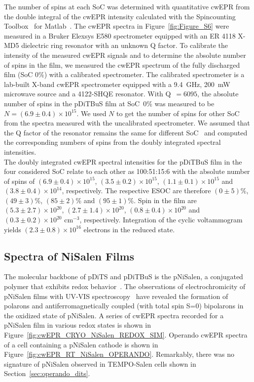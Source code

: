 The number of spins at each SoC was determined with quantitative cwEPR from the double integral of the cwEPR intensity calculated with the Spincounting Toolbox~\cite{spin_counting_tb} for Matlab~\cite{SI:Matlab}. The cwEPR spectra in Figure~\ref{fig:Figure_S6} were measured in a Bruker Elexsys E580 spectrometer equipped with an ER 4118 X-MD5 dielectric ring resonator with an unknown Q factor. To calibrate the intensity of the measured cwEPR signals and to determine the absolute number of spins in the film, we measured the cwEPR spectrum of the fully discharged film (SoC 0\%) with a calibrated spectrometer. The calibrated spectrometer is a lab-built X-band cwEPR spectrometer equipped with a 9.4~GHz, 200~mW microwave source and a 4122-SHQE resonator. With Q~$=6095$, the absolute number of spins in the pDiTBuS film at SoC~0\% was measured to be $N=(6.9\pm0.4)\times10^{15}$. We used $N$ to get the number of spins for other SoC from the spectra measured with the uncalibrated spectrometer. We assumed that the Q factor of the resonator remains the same for different SoC~\cite{Kulikov2022} and computed the corresponding numbers of spins from the doubly integrated spectral intensities.\\

The doubly integrated cwEPR spectral intensities for the pDiTBuS film in the four considered SoC relate to each other as 100:51:15:6 with the absolute number of spins of $(6.9\pm0.4)\times10^{15}$, $(3.5\pm0.2)\times10^{15}$, $(1.1\pm0.1)\times10^{15}$ and $(3.8\pm0.4)\times10^{14}$, respectively. The respective ESOC are therefore $(0\pm5)$\%, $(49\pm3)$\%, $(85\pm2)$\% and $(95\pm1)$\%. Spin  in the film are $(5.3\pm2.7)\times10^{20}$, $(2.7\pm1.4)\times10^{20}$, $(0.8\pm0.4)\times10^{20}$ and $(0.3\pm0.2)\times10^{20}$ cm$^{-3}$, respectively. Integration of the cyclic voltammogram yields $(2.3\pm0.8)\times10^{16}$ electrons in the reduced state.\\



\subsection{Spectra of NiSalen Films}
The molecular backbone of pDiTS and pDiTBuS is the pNiSalen, a conjugated polymer that exhibits redox behavior~\cite{Dmitrieva2018,Vereshchagin2020,Apraksin2021}. The observations of electrochromicity of pNiSalen films with UV-VIS spectroscopy~\cite{Dmitrieva2018} have revealed the formation of polarons and antiferromagnetically coupled (with total spin S=0) bipolarons in the oxidized state of pNiSalen. A series of cwEPR spectra recorded for a pNiSalen film in various redox states is shown in Figure~\ref{fig:cwEPR_CRYO_NiSalen_REDOX_SIM}. Operando cwEPR spectra of a cell containing a pNiSalen cathode is shown in Figure~\ref{fig:cwEPR_RT_NiSalen_OPERANDO}. Remarkably, there was no signature of pNiSalen observed in TEMPO-Salen cells shown in Section~\ref{sec:operando_dits}.

